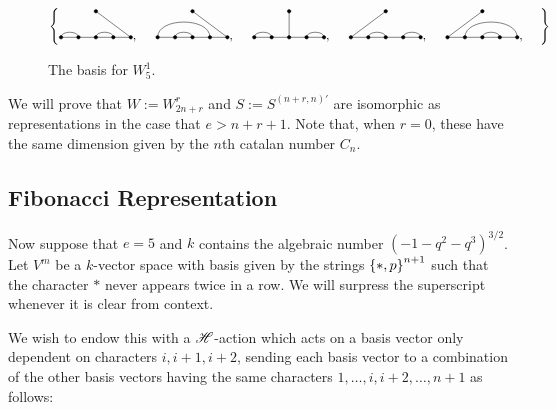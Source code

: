 \documentclass{amsart}
\begin{document}
\begin{figure} 
  \def\cbasisspacing{5mm}
  $\cbr{
    \begin{gathered}
      \GeneralizedMatching{5}{1/2, 3/4}{1}{5/1}{3/4}, \hspace{\cbasisspacing}
      \GeneralizedMatching{5}{1/4, 2/3}{1}{5/1}{3/4}, \hspace{\cbasisspacing}
      \GeneralizedMatching{5}{1/2, 4/5}{1}{3/1}{3/4}, \hspace{\cbasisspacing}
      \GeneralizedMatching{5}{2/3, 4/5}{1}{1/1}{3/4}, \hspace{\cbasisspacing}
      \GeneralizedMatching{5}{2/5, 3/4}{1}{1/1}{3/4}, \hspace{\cbasisspacing}
     \end{gathered}}$ 
    \caption{The basis for $W_5^1$.}
  \label{S5 Basis}
\end{figure} 

We will prove that $W := W_{2n+r}^r$ and $S := S^{(n+r,n)'}$ are isomorphic as representations in the case that $e > n + r + 1$.
Note that, when $r = 0$, these have the same dimension given by the $n$th catalan number $C_n$.
 
\subsection{Fibonacci Representation}
Now suppose that $e = 5$ and $k$ contains the algebraic number $(-1 - q^2 - q^3)^{3/2}$.
Let $V^m$ be a $k$-vector space with basis given by the strings $\left\{ *,p \right\}^{n+1}$ such that the character $*$ never appears twice in a row. 
We will surpress the superscript whenever it is clear from context.

We wish to endow this with a $\mathscr{H}$-action which acts on a basis vector only dependent on characters $i,i+1,i+2$, sending each basis vector to a combination of the other basis vectors having the same characters $1,\dots,i,i+2,\dots,n+1$ as follows:
\def\vara{\alpha}
\def\varb{\beta}
\def\varc{\gamma}
\def\vard{\delta}
\def\vare{\varepsilon}
\end{document}
